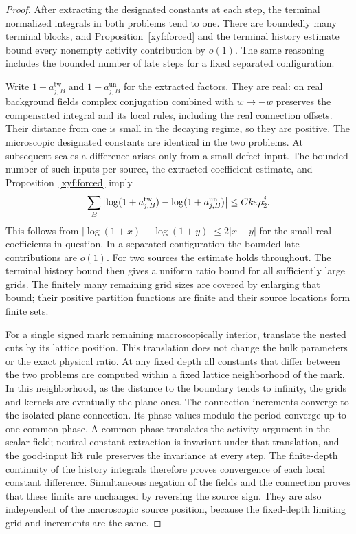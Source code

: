 \begin{proof}
After extracting the designated constants at each step, the
terminal normalized integrals in both problems tend to one.
There are boundedly many terminal blocks, and
Proposition~\ref{xyf:forced} and the terminal history estimate bound
every nonempty activity contribution by \(o(1)\).  The same reasoning
includes the bounded number of late steps for a fixed separated
configuration.

Write \(1+a_{j,B}^{\mathrm{tw}}\) and
\(1+a_{j,B}^{\mathrm{un}}\) for the extracted factors.
They are real: on real background fields complex conjugation
combined with \(w\mapsto-w\) preserves the compensated integral
and its local rules, including the real connection offsets.
Their distance from one is small in the decaying regime, so they
are positive.  The microscopic designated constants are identical
in the two problems.  At subsequent scales a difference arises
only from a small defect input.  The bounded number of such inputs
per source, the extracted-coefficient estimate, and
Proposition~\ref{xyf:forced} imply
\begin{equation}
 \sum_B\left|\log(1+a_{j,B}^{\mathrm{tw}})
                 -\log(1+a_{j,B}^{\mathrm{un}})\right|
       \le Ck\varepsilon\rho_2^j.
 \label{xyf:logtail}
\end{equation}
This follows from \(|\log(1+x)-\log(1+y)|\le2|x-y|\)
for the small real coefficients in question.  In a separated
configuration the bounded late contributions are \(o(1)\).
For two sources the estimate holds throughout.  The terminal
history bound then gives a uniform ratio bound for all sufficiently
large grids.  The finitely many remaining grid sizes are covered
by enlarging that bound; their positive partition functions are
finite and their source locations form finite sets.

For a single signed mark remaining macroscopically interior,
translate the nested cuts by its lattice position.  This translation
does not change the bulk parameters or the exact physical ratio.
At any fixed depth all constants that differ between the two
problems are computed within a fixed lattice neighborhood of the
mark.  In this neighborhood, as the distance to the boundary tends
to infinity, the grids and kernels are eventually the plane ones.
The connection increments converge to the isolated plane connection.
Its phase values modulo the period converge up to one common phase.
A common phase translates the activity argument in the scalar
field; neutral constant extraction is invariant under that
translation, and the good-input lift rule preserves the invariance
at every step.  The finite-depth continuity of the history integrals
therefore proves convergence of each local constant difference.
Simultaneous negation of the fields and the connection proves that
these limits are unchanged by reversing the source sign.
They are also independent of the macroscopic source position,
because the fixed-depth limiting grid and increments are the same.


\end{proof}
